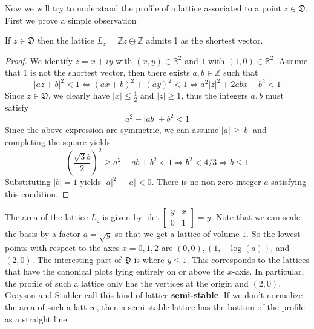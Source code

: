 Now we will try to understand the profile of a lattice associated to a point $z \in \mathfrak{D}$. First we
prove a simple observation
\begin{lemma}
  If $z \in \mathfrak{D}$ then the lattice $L_z = \mathbb{Z}z\oplus \mathbb{Z}$ admits 1 as the shortest vector.
\end{lemma}
\begin{proof}
  We identify $z = x+iy$ with $(x,y) \in \mathbb{R}^2$ and $1$ with $(1,0) \in \mathbb{R}^2$.
  Assume that $1$ is not the shortest vector, then there exists $a,b \in \mathbb{Z}$ such that
  \[ |az+b|^2 < 1 \Leftrightarrow (ax+b)^2+(ay)^2 < 1\Leftrightarrow a^2|z|^2+2abx+b^2< 1\]
  Since $z \in \mathfrak{D}$, we clearly have $|x| \le \frac{1}{2}$ and $|z| \ge 1$,  thus the integers $a,b$ must
  satisfy
  \[ a^2 -|ab|+b^2 < 1\]
  Since the above expression are symmetric, we can assume $|a| \ge |b|$ and completing the square yields
  \[\left(\dfrac{\sqrt{3}b}{2}\right)^2 \ge a^2-ab+b^2 <1 \Rightarrow b^2<4/3 \Rightarrow b \le 1\]
  Substituting $|b|=1$ yields $|a|^2-|a|<0$. There is no non-zero integer $a$ satisfying this condition.
\end{proof}
The area of the lattice $L_z$ is given by $\det\begin{bmatrix}
    y & x \\
    0 & 1
  \end{bmatrix} = y$. Note that we can scale the basis by a factor $a=\sqrt{y}$ so that we get a lattice of volume $1$.
So the lowest points with respect to the axes $x = 0,1,2$ are $(0,0), (1,-\log(a))$, and $(2,0)$.
The interesting part of $\mathfrak{D}$ is where $y\le 1$. This corresponds to the lattices
that have the canonical plots lying entirely on or above the $x$-axis. In particular, the profile of such a lattice
only has the vertices at the origin and $(2,0)$. Grayson and Stuhler call this kind of lattice
\textbf{semi-stable}. If we don't normalize the area of such a lattice, then a semi-stable
lattice has the bottom of the profile as a straight line.

